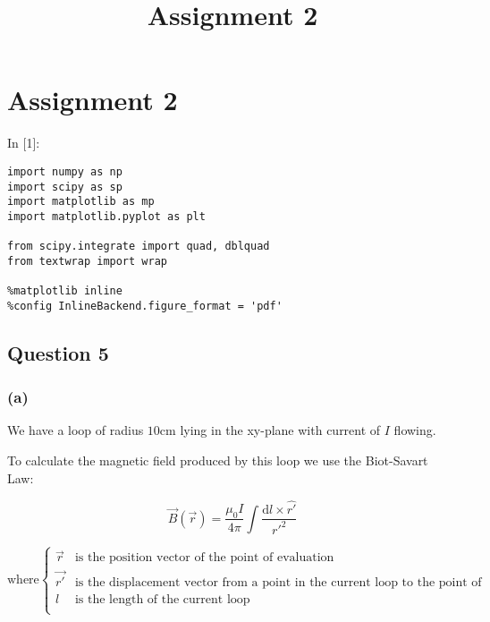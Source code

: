 \documentclass[11pt]{article}
\title{Assignment 2}
\newif\ifcode
\newif\ifleftmargins
\newlength{\promptlength}
\newcommand{\prompt}[3]{
        \needspace{1.1cm}
        \settowidth{\promptlength}{ #1 [#3] }
        \ifleftmargins\hspace{-\promptlength}\hspace{-5pt}\fi
        {\color{#2}#1 [#3]:}
        \ifleftmargins\vspace{-2.7ex}\fi
    }
\begin{document}
    
    
    
    
    

    
    \hypertarget{assignment-2}{%
\section{Assignment 2}\label{assignment-2}}

    
\prompt{In}{incolor}{1}
\codetrue
\begin{tcolorbox}[breakable, size=fbox, boxrule=1pt, pad at break*=1mm, colback=cellbackground, colframe=cellborder]
\begin{verbatim}
import numpy as np
import scipy as sp
import matplotlib as mp
import matplotlib.pyplot as plt

from scipy.integrate import quad, dblquad
from textwrap import wrap

%matplotlib inline
%config InlineBackend.figure_format = 'pdf'
\end{verbatim}
\end{tcolorbox}
\codefalse

    \hypertarget{question-5}{%
\subsection{Question 5}\label{question-5}}

    \hypertarget{a}{%
\subsubsection{(a)}\label{a}}

We have a loop of radius \(10\)cm lying in the xy-plane with current of
\(I\) flowing.

To calculate the magnetic field produced by this loop we use the
Biot-Savart Law:

\[\vec{B}(\vec{r}) = \frac{\mu_0 I}{4 \pi} \int \frac{\text{d}l \times \hat{r'}}{r'^2}\]

\[\text{where} \left\{ \begin{array}{ll}
            \vec{r}  & \text{is the position vector of the point of evaluation} \\
            \vec{r'} & \text{is the displacement vector from a point in the current loop to the point of evaluation} \\
            l        & \text{is the length of the current loop} \\
            \end{array} \right.\]
\end{document}
